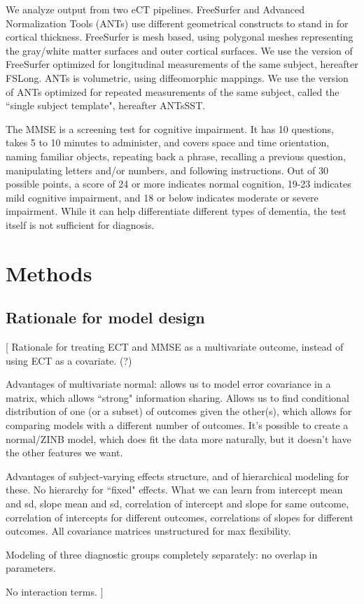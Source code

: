 \documentclass[12pt]{article}
\begin{document}
We analyze output from two eCT pipelines. FreeSurfer and Advanced Normalization Tools (ANTs) use different geometrical constructs to stand in for cortical thickness. FreeSurfer is mesh based, using polygonal meshes representing the gray/white matter surfaces and outer cortical surfaces. We use the version of FreeSurfer optimized for longitudinal measurements of the same subject, hereafter FSLong. ANTs is volumetric, using diffeomorphic mappings. We use the version of ANTs optimized for repeated measurements of the same subject, called the ``single subject template", hereafter ANTsSST. 

The MMSE is a screening test for cognitive impairment. It has 10 questions, takes 5 to 10 minutes to administer, and covers space and time orientation, naming familiar objects, repeating back a phrase, recalling a previous question, manipulating letters and/or numbers, and following instructions. Out of 30 possible points, a score of 24 or more indicates normal cognition, 19-23 indicates mild cognitive impairment, and 18 or below indicates moderate or severe impairment. While it can help differentiate different types of dementia, the test itself is not sufficient for diagnosis.

\pagebreak
\section{Methods}

\subsection{Rationale for model design}

{\color{teal}[
Rationale for treating ECT and MMSE as a multivariate outcome, instead of using ECT as a covariate. (?)

Advantages of multivariate normal: allows us to model error covariance in a matrix, which allows ``strong" information sharing. Allows us to find conditional distribution of one (or a subset) of outcomes given the other(s), which allows for comparing models with a different number of outcomes. It's possible to create a normal/ZINB model, which does fit the data more naturally, but it doesn't have the other features we want.

Advantages of subject-varying effects structure, and of hierarchical modeling for these. No hierarchy for ``fixed" effects. What we can learn from intercept mean and sd, slope mean and sd, correlation of intercept and slope for same outcome, correlation of intercepts for different outcomes, correlations of slopes for different outcomes. All covariance matrices unstructured for max flexibility. 

Modeling of three diagnostic groups completely separately: no overlap in parameters.

No interaction terms.
]}
\end{document}
